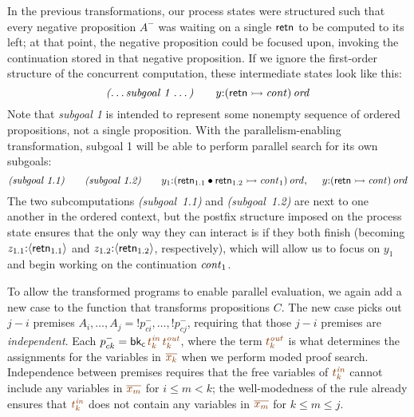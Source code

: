 In the previous transformations, our process states were structured
such that every negative proposition $A^-$ was waiting on a single
${\sf retn}$ to be computed to its left; at that point, the negative
proposition could be focused upon, invoking the
continuation stored in that negative proposition. If we ignore the
first-order structure of the concurrent computation, these
intermediate states look like this:
\[ 
  \mbox{\it (\ldots subgoal 1 \ldots)}
  ~~~~~~
  y{:}{({\sf retn} \rightarrowtail {\it cont})}\,{{\it ord}}
\]
Note that {\it subgoal 1} is intended to represent some nonempty
sequence of ordered propositions, not a single proposition. With the
parallelism-enabling transformation, subgoal 1 will be able to perform
parallel search for its own subgoals:
\[ 
 \mbox{\it (subgoal 1.1)}
 ~~~~~~
 \mbox{\it (subgoal 1.2)} 
 ~~~~~~
   y_1{:}{({\sf retn}_{1.1} \mathbin{\bullet} {\sf retn}_{1.2} \rightarrowtail {\it cont}_1)}\,{{\it ord}}, 
 ~~~~
   y{:}{({\sf retn} \rightarrowtail {\it cont})}\,{{\it ord}}
\]
The two subcomputations \mbox{\it (subgoal 1.1)} and \mbox{\it (subgoal
  1.2)} are next to one another in the ordered context, but the
postfix structure imposed on the
process state ensures that the only way they
can interact is if they both finish (becoming $z_{1.1}{:}\langle {{\sf
    retn}_{1.1}} \rangle$ and $z_{1.2}{:}\langle {{\sf retn}_{1.2}} \rangle$, 
respectively), which will
allow us to focus on $y_1$ and begin working on the continuation ${\it
  cont}_1$. 

To allow the transformed programs to enable parallel evaluation, we again add a
new case to the function that transforms propositions $C$.  The new
case picks out $j - i$ premises $A_i, \ldots, A_j =
{!}p^-_{ci},\ldots,{!}p^-_{cj}$, requiring that those $j - i$ premises
are {\it independent}. Each $p^-_{ck} = {\sf bk_c}\,\lf{t^{\it
    in}_k}\,\lf{t^{\it out}_k}$, where the term $\lf{t^{\it out}_k}$
is what determines the assignments for the variables in
$\lf{\overline{x_k}}$ when we perform moded proof search. Independence
between premises requires that the free variables of $\lf{t^{\it
    in}_k}$ cannot include any variables in $\lf{\overline{x_m}}$ for
$i \leq m < k$; the well-modedness of the rule already ensures that 
$\lf{t^{\it in}_k}$ does not contain any variables in 
$\lf{\overline{x_m}}$ for $k \leq m \leq j$.

